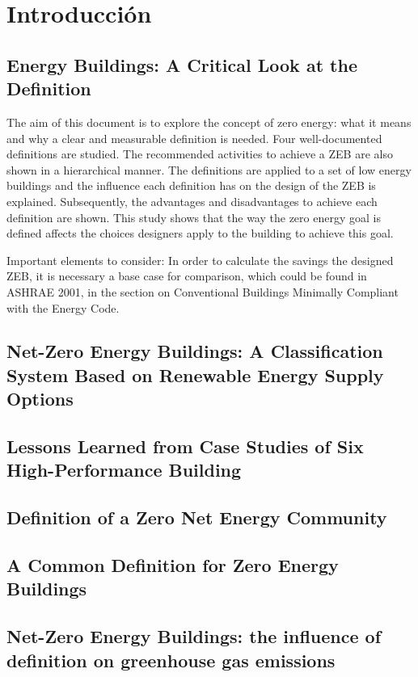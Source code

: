 \chapter{Introducción}
\label{chap:introduccion}

 


\section{Energy Buildings: A Critical Look at the Definition}

The aim of this document is to explore the concept of zero energy: what it means and why a clear and measurable definition is needed. Four well-documented definitions are studied. The recommended activities to achieve a ZEB are also shown in a hierarchical manner. The definitions are applied to a set of low energy buildings and the influence each definition has on the design of the ZEB is explained. Subsequently, the advantages and disadvantages to achieve each definition are shown. This study shows that the way the zero energy goal is defined affects the choices designers apply to the building to achieve this goal.


Important elements to consider: In order to calculate the savings the designed ZEB, it is necessary a base case for comparison, which could be found in ASHRAE 2001, in the section on Conventional Buildings Minimally Compliant with the Energy Code.
\section{Net-Zero Energy Buildings: A Classification System Based on Renewable Energy Supply Options}

\section{Lessons Learned from Case Studies of Six High-Performance Building}

\section{Definition of a Zero Net Energy Community}

\section{A Common Definition for Zero Energy Buildings}

\section{Net-Zero Energy Buildings: the influence of definition on greenhouse gas emissions}

